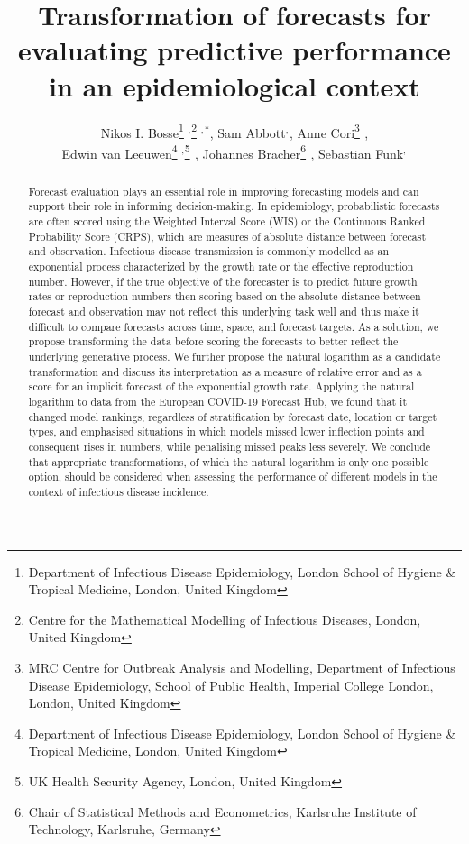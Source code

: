 \documentclass{article}
\begin{document}
\title{Transformation of forecasts for evaluating predictive performance in an epidemiological context}
  \author{Nikos I. Bosse\thanks{Department of Infectious Disease Epidemiology, London School of Hygiene \& Tropical Medicine, London, United Kingdom} $^{,}$\thanks{Centre for the Mathematical Modelling of Infectious Diseases, London, United Kingdom} $^{,*}$, 
  Sam Abbott\footnotemark[1] $^{,}$\footnotemark[2]$ ^{}$, 
  Anne Cori\thanks{MRC Centre for Outbreak Analysis and Modelling, Department of Infectious Disease Epidemiology, School of Public Health, Imperial College London, London, United Kingdom} $^{}$, \\
  Edwin van Leeuwen\thanks{Department of Infectious Disease Epidemiology, London School of Hygiene \& Tropical Medicine, London, United Kingdom} $^{,}$\thanks{UK Health Security Agency, London, United Kingdom} $^{}$, 
  Johannes Bracher\thanks{Chair of Statistical Methods and Econometrics, Karlsruhe Institute of Technology, Karlsruhe, Germany} $^{}$, 
  Sebastian Funk\footnotemark[1] $^{,}$\footnotemark[2]$ ^{}$}



\maketitle
\begin{abstract}
Forecast evaluation plays an essential role in improving forecasting models and can support their role in informing decision-making. In epidemiology, probabilistic forecasts are often scored using the Weighted Interval Score (WIS) or the Continuous Ranked Probability Score (CRPS), which are measures of absolute distance between forecast and observation. Infectious disease transmission is commonly modelled as an exponential process characterized by the growth rate or the effective reproduction number. However, if the true objective of the forecaster is to predict future growth rates or reproduction numbers then scoring based on the absolute distance between forecast and observation may not reflect this underlying task well and thus make it difficult to compare forecasts across time, space, and forecast targets. As a solution, we propose transforming the data before scoring the forecasts to better reflect the underlying generative process. We further propose the natural logarithm  as a candidate transformation and discuss its interpretation as a measure of relative error and as a score for an implicit forecast of the exponential growth rate. Applying the natural logarithm to data from the European COVID-19 Forecast Hub, we found that it changed model rankings, regardless of stratification by forecast date, location or target types, and emphasised situations in which models missed lower inflection points and consequent rises in numbers, while penalising missed peaks less severely. We conclude that appropriate transformations, of which the natural logarithm is only one possible option, should be considered when assessing the performance of different models in the context of infectious disease incidence. 
\end{abstract}
\end{document}
